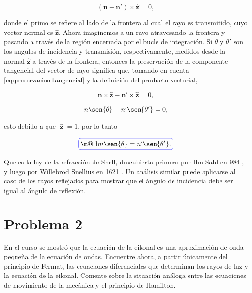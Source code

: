 \documentclass[a4paper,10pt]{article}
\makeatletter
\numberwithin{equation}{section}
\newcommand*{\boxcolor}{blue}
\renewcommand{\boxed}[1]{\textcolor{\boxcolor}{%
\tikz[baseline={([yshift=-1ex]current bounding box.center)}] \node [rectangle, minimum width=1ex,rounded corners,draw] {\normalcolor\m@th$\displaystyle#1$};}}
\makeatother
\begin{document}
\begin{equation}
 (\mathbf{n} - \mathbf{n}') \times \hat{\mathbf{z}} = 0,
 \label{eq:preservacionTangencial}
\end{equation}

donde el primo se refiere al lado de la frontera al cual el rayo es transmitido, 
cuyo vector normal es $\hat{\mathbf{z}}$. Ahora imaginemos a un rayo atravesando 
la frontera y pasando a través de la región encerrada por el bucle de integración. 
Si $\theta$ y $\theta'$ son los ángulos de incidencia y transmisión, respectivamente, 
medidos desde la normal $\hat{\mathbf{z}}$ a través de la frontera, entonces la 
preservación de la componente tangencial del vector de rayo significa que, 
tomando en cuenta \eqref{eq:preservacionTangencial} y la definición del 
producto vectorial,

\begin{equation}
 \mathbf{n} \times \hat{\mathbf{z}} - \mathbf{n}' \times \hat{\mathbf{z}} = 0,
\end{equation}

\begin{equation}
 n\sen{\theta} - n'\sen{\theta'} = 0,
\end{equation}

esto debido a que $|\hat{\mathbf{z}}| = 1$, por lo tanto 

\begin{equation}
 \boxed{n\sen{\theta} = n'\sen{\theta'}.}
\end{equation}

Que es la ley de la refracción de Snell, descubierta primero por Ibn Sahl en 984 \cite{rashed}, 
y luego por Willebrod Snellius en 1621 \cite{holm}. Un análisis similar puede aplicarse al 
caso de los rayos reflejados para mostrar que el ángulo de incidencia debe ser igual 
al ángulo de reflexión.

\section{Problema 2}

En el curso se mostró que la ecuación de la eikonal es una aproximación de onda 
pequeña de la ecuación de ondas. Encuentre ahora, a partir únicamente del principio 
de Fermat, las ecuaciones diferenciales que determinan los rayos de luz y la ecuación 
de la eikonal. Comente sobre la situación análoga entre las ecuaciones de movimiento 
de la mecánica y el principio de Hamilton.

\vspace{.3cm}
\end{document}
